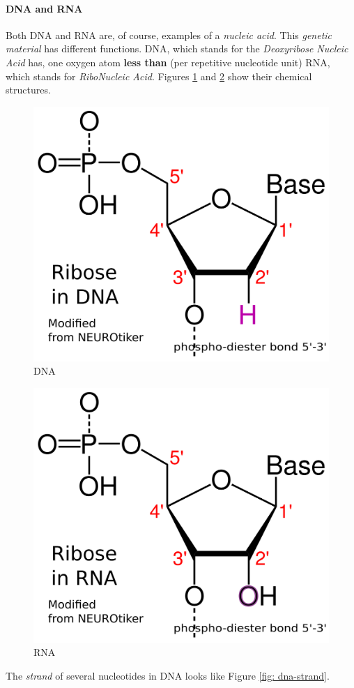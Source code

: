 \documentclass[12pt]{article}
\begin{document}
\paragraph{DNA and RNA}
Both DNA and RNA are, of course, examples of a \emph{nucleic acid}. This \emph{genetic material} has different functions. DNA, which stands for the \emph{Deoxyribose Nucleic Acid} has, one oxygen atom \textbf{less than} (per repetitive nucleotide unit) RNA, which stands for \emph{RiboNucleic Acid}. Figures \ref{fig: dna} and \ref{fig: rna} show their chemical structures.

\begin{figure}[ht!]
    \centering
    \includegraphics[width=0.5\linewidth]{dna-ribose-numbering-std-notation.png}
    \caption{DNA}
    \label{fig: dna}
\end{figure}

\begin{figure}[ht!]
    \centering
    \includegraphics[width=0.5\linewidth]{rna-ribose-numbering-std-notation.png}
    \caption{RNA}
    \label{fig: rna}
\end{figure}

The \emph{strand} of several nucleotides in DNA looks like Figure \ref{fig: dna-strand}.
\end{document}
